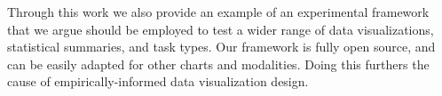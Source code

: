 \documentclass[sigconf]{acmart}
\begin{document}
Through this work we also provide an example of an experimental
framework that we argue should be employed to test a wider range of data
visualizations, statistical summaries, and task types. Our framework is
fully open source, and can be easily adapted for other charts and
modalities. Doing this furthers the cause of empirically-informed data
visualization design.




\end{document}
